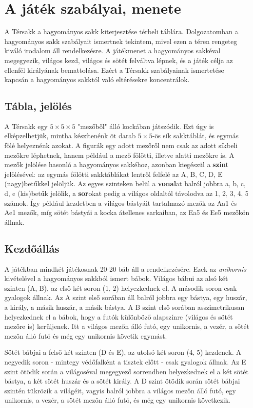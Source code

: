 \documentclass[12pt, twoside]{report}
\begin{document}
\section{A játék szabályai, menete}
A Térsakk a hagyományos sakk kiterjesztése térbeli táblára. Dolgozatomban a hagyományos sakk szabályait ismertnek tekintem, mivel ezen a téren rengeteg kiváló irodalom áll rendelkezésre. A játékmenet a hagyományos sakkéval megegyezik, világos kezd, világos és sötét felváltva lépnek, és a játék célja az ellenfél királyának bemattolása. Ezért a Térsakk szabályainak ismertetése kapcsán a hagyományos sakktól való eltérésekre koncentrálok.

\subsection{Tábla, jelölés}
A Térsakk egy $ 5 \times 5 \times 5 $ "mezőből" álló kockában játszódik. Ezt úgy is elképzelhetjük, mintha készítenénk öt darab $ 5 \times 5 $-ös sík sakktáblát, és egymás fölé helyeznénk azokat. A figurák egy adott mezőről nem csak az adott síkbeli mezőkre léphetnek, hanem például a mező fölötti, illetve alatti mezőkre is. A mezők jelölése hasonló a hagyományos sakkéhoz, azonban kiegészül a \textbf{szint} jelölésével: az egymás fölötti sakktáblákat lentről felfelé az A, B, C, D, E (nagy)betűkkel jelöljük. Az egyes szinteken belül a \textbf{vonal}at balról jobbra a, b, c, d, e (kis)betűk jelölik, a \textbf{sor}okat pedig a világos oldaltól távolodva az 1, 2, 3, 4, 5 számok. Így például kezdetben a világos bástyáit tartalmazó mezők az Aa1 és Ae1 mezők, míg sötét bástyái a kocka átellenes sarkaiban, az Ea5 és Ee5 mezőkön állnak.

\subsection{Kezdőállás}
A játékban mindkét játékosnak 20-20 báb áll a rendelkezésére. Ezek az \textit{unikornis} kivételével a hagyományos sakkból ismert bábok. Világos bábui az alsó két szinten (A, B), az első két soron (1, 2) helyezkednek el. A második soron csak gyalogok állnak. Az A szint első sorában áll balról jobbra egy bástya, egy huszár, a király, a másik huszár, a másik bástya. A B szint első sorában asszimetrikusan helyezkednek el a bábok, hogy a futók különböző alapszínre (világos és sötét mezőre is) kerüljenek. Itt a világos mezőn álló futó, egy unikornis, a vezér, a sötét mezőn álló futó és még egy unikornis követik egymást.

Sötét bábjai a felső két szinten (D és E), az utolsó két soron (4, 5) kezdenek. A negyedik soron - mintegy védőfalként a tisztek előtt - csak gyalogok állnak. Az E szint ötödik során a világoséval megegyező sorrendben helyezkednek el a két sötét bástya, a két sötét huszár és a sötét király. A D szint ötödik során sötét bábjai szintén tükrözik a világéit, vagyis balról jobbra a világos mezőn álló futó, egy unikornis, a vezér, a sötét mezőn álló futó, és még egy unikornis következik.
\end{document}
